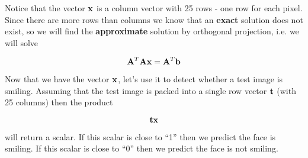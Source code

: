 Notice that the vector $\mathbf{x}$ is a column vector with 25 rows - one row for each pixel. Since there are more rows than columns we know that an \textbf{exact} solution does not exist, so we will find the \textbf{approximate} solution by orthogonal projection, i.e. we will solve

\[\mathbf{A}^T \mathbf{A} \mathbf{x} = \mathbf{A}^T \mathbf{b} \]

Now that we have the vector $\mathbf{x}$, let's use it to detect whether a test image is smiling. Assuming that the test image is packed into a single row vector $\mathbf{t}$ (with 25 columns) then the product 

\[\mathbf{t} \mathbf{x} \]

will return a scalar. If this scalar is close to ``1'' then we predict the face is smiling. If this scalar is close to ``0'' then we predict the face is not smiling.

